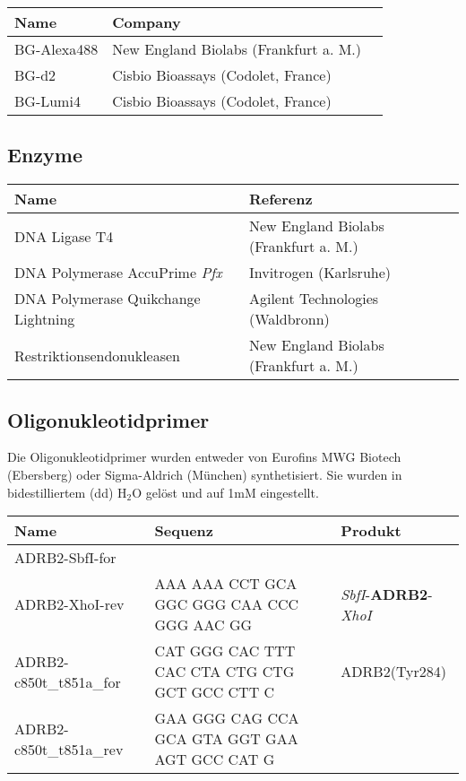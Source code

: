 \begin{table}[htsb]
\begin{tabular}{lll}
\toprule
Name							&	Company\\
\midrule
BG-Alexa488						&	New England Biolabs (Frankfurt a. M.)\\
BG-d2							&	Cisbio Bioassays (Codolet, France)\\
BG-Lumi4						&	Cisbio Bioassays (Codolet, France)\\
\bottomrule
\end {tabular}
\end{table}

\subsection{Enzyme}

\begin{tabularx}{\textwidth}{lll}
\toprule
Name							&	Referenz\\
\midrule
DNA Ligase T4							&	New England Biolabs (Frankfurt a. M.)\\
DNA Polymerase AccuPrime \textit{Pfx}	&	Invitrogen (Karlsruhe)\\
DNA Polymerase Quikchange Lightning		&	Agilent Technologies (Waldbronn)\\
Restriktionsendonukleasen				&	New England Biolabs (Frankfurt a. M.)\\
\bottomrule
		
\end {tabularx}


\subsection{Oligonukleotidprimer}
Die Oligonukleotidprimer wurden entweder von Eurofins MWG Biotech (Ebersberg) oder Sigma-Aldrich (München) synthetisiert. Sie wurden in bidestilliertem (dd) H$_2$O gelöst und auf 1\si{\milli M} eingestellt. 
 
\begin{tabularx}{\textwidth}{lXl}
\toprule
Name		&	Sequenz 					&	Produkt\\
\midrule
ADRB2-SbfI-for	&&\\
ADRB2-XhoI-rev	&	AAA AAA CCT GCA GGC GGG CAA CCC GGG AAC GG	&	\textit{SbfI}-\textbf{ADRB2}-\textit{XhoI}\\
ADRB2-c850t\_t851a\_for	& 	CAT GGG CAC TTT CAC CTA CTG CTG GCT GCC CTT C & ADRB2(Tyr284)\\
ADRB2-c850t\_t851a\_rev	&	GAA GGG CAG CCA GCA GTA GGT GAA AGT GCC CAT G &\\
\bottomrule
\end{tabularx}

